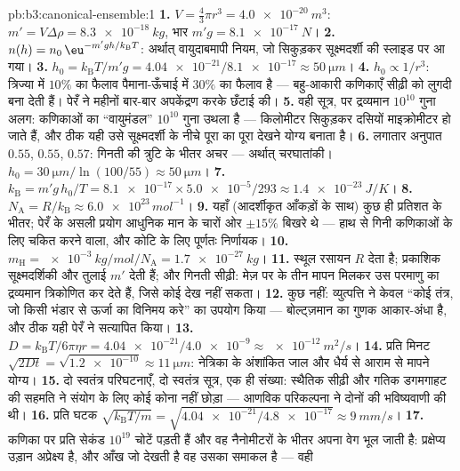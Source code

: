 \begin{solution}{pb:b3:canonical-ensemble:1}
\textbf{1.} $V = \tfrac43\pi r^3 = \qty{4.0e-20}{m^3}$: $m' = V
\Delta\rho = \qty{8.3e-18}{kg}$, भार $m'g = \qty{8.1e-17}{N}$।
\textbf{2.} $n(h) = n_0\,\eu^{-m'gh/k_{\text{B}}T}$: अर्थात्
वायुदाबमापी नियम, जो सिकुड़कर सूक्ष्मदर्शी की स्लाइड पर आ गया।
\textbf{3.} $h_0 = k_{\text{B}}T/m'g = \num{4.04e-21}/\num{8.1e-17}
\approx \qty{50}{\micro m}$।
\textbf{4.} $h_0 \propto 1/r^3$: त्रिज्या में $10\%$ का फैलाव
पैमाना-ऊँचाई में $30\%$ का फैलाव है --- बहु-आकारी कणिकाएँ सीढ़ी को
लुगदी बना देती हैं। पेरँ ने महीनों बार-बार अपकेंद्रण करके छँटाई की।
\textbf{5.} वही सूत्र, पर द्रव्यमान $10^{10}$ गुना अलग: कणिकाओं का
``वायुमंडल'' $10^{10}$ गुना उथला है --- किलोमीटर सिकुड़कर दसियों
माइक्रोमीटर हो जाते हैं, और ठीक यही उसे सूक्ष्मदर्शी के नीचे पूरा का
पूरा देखने योग्य बनाता है।
\textbf{6.} लगातार अनुपात $0.55$, $0.55$, $0.57$: गिनती की त्रुटि
के भीतर अचर --- अर्थात् चरघातांकी। $h_0 =
\qty{30}{\micro m}/\ln(100/55) \approx \qty{50}{\micro m}$।
\textbf{7.} $k_{\text{B}} = m'g\,h_0/T = \num{8.1e-17} \times
\num{5.0e-5}/293 \approx \qty{1.4e-23}{J/K}$।
\textbf{8.} $N_{\text{A}} = R/k_{\text{B}} \approx
\num{6.0e23}\,\unit{mol^{-1}}$।
\textbf{9.} यहाँ (आदर्शीकृत आँकड़ों के साथ) कुछ ही प्रतिशत के भीतर;
पेरँ के असली प्रयोग आधुनिक मान के चारों ओर $\pm15\%$ बिखरे थे
--- हाथ से गिनी कणिकाओं के लिए चकित करने वाला, और कोटि के लिए
पूर्णतः निर्णायक।
\textbf{10.} $m_{\text{H}} = \qty{e-3}{kg/mol}/N_{\text{A}} =
\qty{1.7e-27}{kg}$।
\textbf{11.} स्थूल रसायन $R$ देता है; प्रकाशिक सूक्ष्मदर्शिकी और
तुलाई $m'$ देती हैं; और गिनती सीढ़ी: मेज़ पर के तीन मापन मिलकर उस
परमाणु का द्रव्यमान त्रिकोणित कर देते हैं, जिसे कोई देख नहीं सकता।
\textbf{12.} कुछ नहीं: व्युत्पत्ति ने केवल ``कोई तंत्र, जो किसी
भंडार से ऊर्जा का विनिमय करे'' का उपयोग किया --- बोल्ट्ज़मान का गुणक
आकार-अंधा है, और ठीक यही पेरँ ने सत्यापित किया।
\textbf{13.} $D = k_{\text{B}}T/6\pi\eta r =
\num{4.04e-21}/\num{4.0e-9} \approx \qty{e-12}{m^2/s}$।
\textbf{14.} प्रति मिनट $\sqrt{2Dt} = \sqrt{\num{1.2e-10}} \approx
\qty{11}{\micro m}$: नेत्रिका के अंशांकित जाल और धैर्य से आराम से
मापने योग्य।
\textbf{15.} दो स्वतंत्र परिघटनाएँ, दो स्वतंत्र सूत्र,
एक ही संख्या: स्थैतिक सीढ़ी और गतिक डगमगाहट की सहमति ने संयोग के लिए
कोई कोना नहीं छोड़ा --- आणविक परिकल्पना ने दोनों की भविष्यवाणी की थी।
\textbf{16.} प्रति घटक $\sqrt{k_{\text{B}}T/m} = \sqrt{\num{4.04e-21}/
\num{4.8e-17}} \approx \qty{9}{mm/s}$।
\textbf{17.} कणिका पर प्रति सेकंड $10^{19}$ चोटें पड़ती हैं और वह
नैनोमीटरों के भीतर अपना वेग भूल जाती है: प्रक्षेप्य उड़ान
अप्रेक्ष्य है, और आँख जो देखती है वह उसका समाकल है --- वही

\end{solution}
